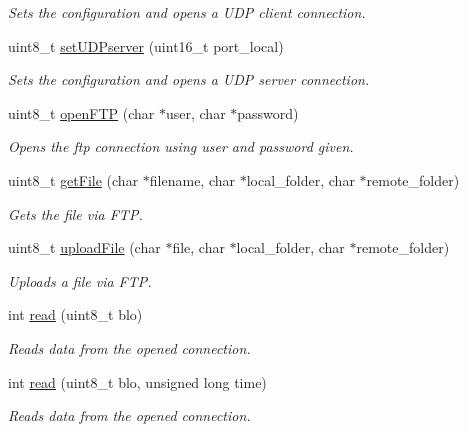 \begin{DoxyCompactItemize}
\begin{DoxyCompactList}\small\item\em Sets the configuration and opens a U\+DP client connection. \end{DoxyCompactList}\item 
uint8\+\_\+t \hyperlink{class_wasp_w_i_f_i_aabba8381eaad271b6969e64ec37cffe8}{set\+U\+D\+Pserver} (uint16\+\_\+t port\+\_\+local)
\begin{DoxyCompactList}\small\item\em Sets the configuration and opens a U\+DP server connection. \end{DoxyCompactList}\item 
uint8\+\_\+t \hyperlink{class_wasp_w_i_f_i_a9ce8111a7441aa530bace7534aa27b2f}{open\+F\+TP} (char $\ast$user, char $\ast$password)
\begin{DoxyCompactList}\small\item\em Opens the ftp connection using user and password given. \end{DoxyCompactList}\item 
uint8\+\_\+t \hyperlink{class_wasp_w_i_f_i_acbd37598d886a0938abe6c611c77f799}{get\+File} (char $\ast$filename, char $\ast$local\+\_\+folder, char $\ast$remote\+\_\+folder)
\begin{DoxyCompactList}\small\item\em Gets the file via F\+TP. \end{DoxyCompactList}\item 
uint8\+\_\+t \hyperlink{class_wasp_w_i_f_i_a8cb96fcf0f69d79a7121823fdce1fe0c}{upload\+File} (char $\ast$file, char $\ast$local\+\_\+folder, char $\ast$remote\+\_\+folder)
\begin{DoxyCompactList}\small\item\em Uploads a file via F\+TP. \end{DoxyCompactList}\item 
int \hyperlink{class_wasp_w_i_f_i_a7a185c100ff9102da5c30522dc533de4}{read} (uint8\+\_\+t blo)
\begin{DoxyCompactList}\small\item\em Reads data from the opened connection. \end{DoxyCompactList}\item 
int \hyperlink{class_wasp_w_i_f_i_a3235fa9a75d45e2f8aab8aa86533a989}{read} (uint8\+\_\+t blo, unsigned long time)
\begin{DoxyCompactList}\small\item\em Reads data from the opened connection. \end{DoxyCompactList}\item 

\end{DoxyCompactItemize}
